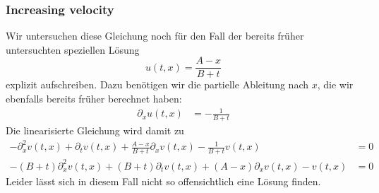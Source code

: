 \subsubsection{Increasing velocity}
Wir untersuchen diese Gleichung noch für den Fall der bereits 
früher untersuchten speziellen Lösung 
\[
u(t,x)=\frac{A-x}{B+t}
\]
explizit aufschreiben. Dazu benötigen wir die partielle Ableitung
nach $x$, die wir ebenfalls bereits früher berechnet haben:
\begin{align*}
\partial_x u(t,x)&=-\frac{1}{B+t}
\end{align*}
Die linearisierte Gleichung wird damit zu
\begin{align*}
-\partial_x^2v(t,x)
+\partial_tv(t,x)
+ \frac{A-x}{B+t}\partial_xv(t,x)
-\frac{1}{B+t} v(t,x)
&=0
\\
-(B+t)\partial_x^2v(t,x)
+(B+t)\partial_tv(t,x)
+ (A-x)\partial_xv(t,x)
- v(t,x)
&=0
\end{align*}
Leider lässt sich in diesem Fall nicht so offensichtlich eine Lösung finden.

